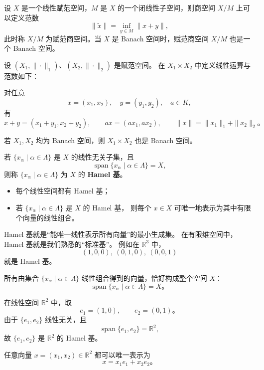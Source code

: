 \begin{theorem}
设 \(X\) 是一个线性赋范空间，\(M\) 是 \(X\) 的一个闭线性子空间，则商空间 \(X/M\) 上可以定义范数
\[
\|\tilde{x}\|=\inf_{y\in M}\|x+y\|,
\]
此时称 \(X/M\) 为赋范商空间。当 \(X\) 是 Banach 空间时，赋范商空间 \(X/M\) 也是一个 Banach 空间。
\end{theorem}
\begin{definition}[赋范空间的乘积]
设 \((X_1,\|\cdot\|_1)\)、\((X_2,\|\cdot\|_2)\) 是赋范空间。  
在 \(X_1\times X_2\) 中定义线性运算与范数如下：

对任意
\[
x=(x_1,x_2),\quad y=(y_1,y_2),\quad a\in K,
\]
有
\[
x+y=(x_1+y_1,x_2+y_2),\qquad
a x=(a x_1,a x_2),\qquad
\|x\|=\|x_1\|_1+\|x_2\|_2。
\]

若 \(X_1,X_2\) 均为 Banach 空间，则 \(X_1\times X_2\) 也是 Banach 空间。
\end{definition}
\begin{definition}
若 \(\{x_\alpha\mid \alpha\in\Lambda\}\) 是 \(X\) 的线性无关子集，且
\[
\operatorname{span}\{x_\alpha\mid \alpha\in\Lambda\}=X,
\]
则称 \(\{x_\alpha\mid \alpha\in\Lambda\}\) 为 \(X\) 的 \textbf{Hamel 基}。

\begin{itemize}
  \item 每个线性空间都有 Hamel 基；
  \item 若 \(\{x_\alpha\mid \alpha\in\Lambda\}\) 是 \(X\) 的 Hamel 基，
  则每个 \(x\in X\) 可唯一地表示为其中有限个向量的线性组合。
\end{itemize}
\end{definition}
\begin{note}
    Hamel 基就是“能唯一线性表示所有向量”的最小生成集。  
在有限维空间中，Hamel 基就是我们熟悉的“标准基”。  
例如在 \(\mathbb{R}^3\) 中，
\[
(1,0,0),\ (0,1,0),\ (0,0,1)
\]
就是 Hamel 基。  

所有由集合 \(\{x_\alpha \mid \alpha \in \Lambda\}\) 线性组合得到的向量，恰好构成整个空间 \(X\)：
\[
\operatorname{span}\{x_\alpha \mid \alpha \in \Lambda\}=X。
\]
\end{note}
\begin{example}
在线性空间 \(\mathbb{R}^2\) 中，取
\[
e_1=(1,0),\qquad e_2=(0,1)。
\]
由于 \(\{e_1,e_2\}\) 线性无关，且
\[
\operatorname{span}\{e_1,e_2\}=\mathbb{R}^2,
\]
故 \(\{e_1,e_2\}\) 是 \(\mathbb{R}^2\) 的 Hamel 基。

任意向量 \(x=(x_1,x_2)\in\mathbb{R}^2\) 都可以唯一表示为
\[
x = x_1 e_1 + x_2 e_2。
\]
\end{example}

